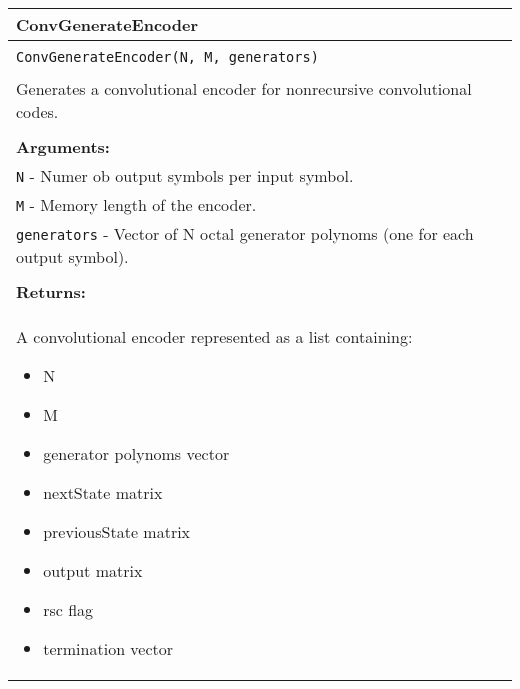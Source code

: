 \begin{longtable}{|p{\textwidth}|}
\hline
\rowcolor{lightblue}ConvGenerateEncoder\\
\hline
\\
\texttt{ConvGenerateEncoder(N, M, generators)}\\
\\
Generates a convolutional encoder for nonrecursive convolutional codes.\\
\\
\textbf{Arguments:}\\
\texttt{N} - Numer ob output symbols per input symbol.\\
\texttt{M} - Memory length of the encoder.\\
\texttt{generators} - Vector of N octal generator polynoms (one for each output symbol).\\
\\
\textbf{Returns:}\\
A convolutional encoder represented as a list containing:
\vspace{-4mm}
\begin{itemize}
\renewcommand\labelitemi{--}
\itemsep-.5em %
\item N
\item M
\item generator polynoms vector
\item nextState matrix
\item previousState matrix
\item output matrix
\item rsc flag
\item termination vector
\end{itemize}
\\
\hline
\end{longtable}